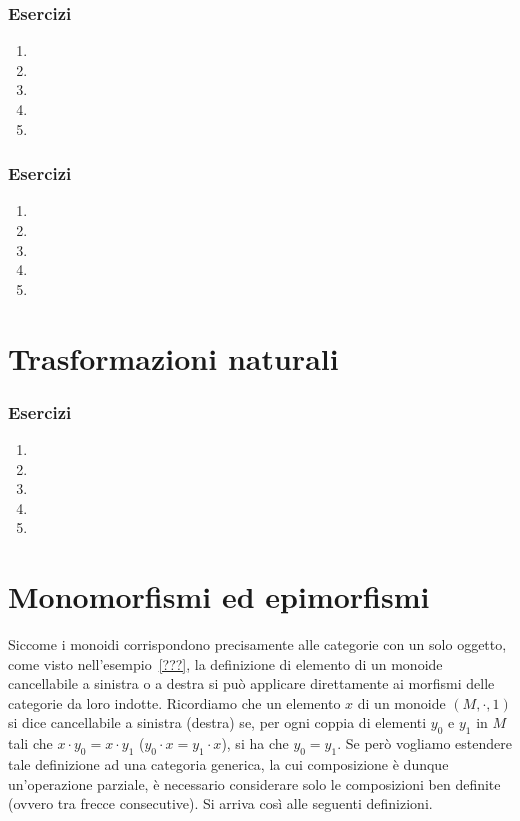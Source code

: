 \subsubsection*{Esercizi}
\begin{enumerate}
	\item
	\item
	\item
	\item
	\item
\end{enumerate}

\subsubsection*{Esercizi}
\begin{enumerate}
	\item
	\item
	\item
	\item
	\item
\end{enumerate}


\section{Trasformazioni naturali}\label{sec_tnat}

\subsubsection*{Esercizi}
\begin{enumerate}
	\item
	\item
	\item
	\item
	\item
\end{enumerate}

\section{Monomorfismi ed epimorfismi}

Siccome i monoidi corrispondono precisamente alle categorie con un solo oggetto, come visto nell'esempio~\ref{???},
la definizione di elemento di un monoide cancellabile a sinistra o a destra si può applicare direttamente ai morfismi delle categorie da loro indotte.
Ricordiamo che un elemento \(x\) di un monoide \((M, \cdot, 1)\) si dice cancellabile a sinistra (destra) se,
per ogni coppia di elementi \(y_0\) e \(y_1\) in \(M\) tali che \(x \cdot y_0 = x \cdot y_1\) (\(y_0 \cdot x = y_1 \cdot x\)),
si ha che \(y_0 = y_1\).
Se però vogliamo estendere tale definizione ad una categoria generica,
la cui composizione è dunque un'operazione parziale,
è necessario considerare solo le composizioni ben definite
(ovvero tra frecce consecutive).
Si arriva così alle seguenti definizioni.

